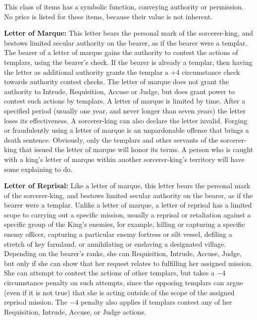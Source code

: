 This class of items has a symbolic function, conveying authority or permission. No price is listed for these items, because their value is not inherent.

\textbf{Letter of Marque:} This letter bears the personal mark of the sorcerer-king, and bestows limited secular authority on the bearer, as if the bearer were a templar. The bearer of a letter of marque gains the authority to contest the actions of templars, using the bearer's  check. If the bearer is already a templar, then having the letter as additional authority grants the templar a +4 circumstance check towards authority contest checks. The letter of marque does not grant the authority to Intrude, Requisition, Accuse or Judge, but does grant power to contest such actions by templars. A letter of marque is limited by time. After a specified period (usually one year, and never longer than seven years) the letter loses its effectiveness. A sorcerer-king can also declare the letter invalid. Forging or fraudulently using a letter of marque is an unpardonable offense that brings a death sentence. Obviously, only the templars and other servants of the sorcerer-king that issued the letter of marque will honor its terms. A person who is caught with a king's letter of marque within another sorcerer-king's territory will have some explaining to do.

\textbf{Letter of Reprisal:} Like a letter of marque, this letter bears the personal mark of the sorcerer-king, and bestows limited secular authority on the bearer, as if the bearer were a templar. Unlike a letter of marque, a letter of reprisal has a limited scope to carrying out a specific mission, usually a reprisal or retaliation against a specific group of the King's enemies, for example, killing or capturing a specific enemy officer, capturing a particular enemy fortress or silt vessel, defiling a stretch of key farmland, or annihilating or enslaving a designated village. Depending on the bearer's  ranks, she can Requisition, Intrude, Accuse, Judge, but only if she can show that her request relates to fulfilling her assigned mission. She can attempt to contest the actions of other templars, but takes a $-4$ circumstance penalty on such attempts, since the opposing templars can argue (even if it is not true) that she is acting outside of the scope of the assigned reprisal mission. The $-4$ penalty also applies if templars contest any of her Requisition, Intrude, Accuse, or Judge actions.